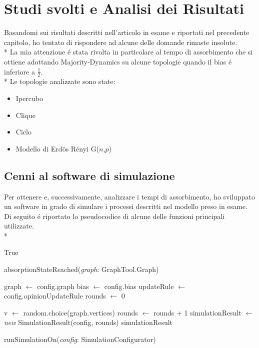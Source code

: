 \documentclass[../Tesi.tex]{subfiles}
\begin{document}
\chapter{Studi svolti e Analisi dei Risultati}
Basandomi sui risultati descritti nell'articolo in esame \cite{DBLP:journals/corr/abs-2008-13589} e riportati nel precedente capitolo, ho tentato di rispondere ad alcune delle domande rimaste insolute.\\*
La mia attenzione \'e stata rivolta in particolare al tempo di assorbimento che si ottiene adottando Majority-Dynamics su alcune topologie quando il bias \'e inferiore a $\frac{1}{2}$.\\*
Le topologie analizzate sono state:
\begin{itemize}
\item Ipercubo
\item Clique
\item Ciclo
\item Modello di Erd{\"o}s R\'enyi G($n$,$p$) \cite{Erdos:1959:pmd}
\end{itemize}

\section{Cenni al software di simulazione}
Per ottenere e, successivamente, analizzare i tempi di assorbimento, ho sviluppato un software in grado di simulare i processi descritti nel modello preso in esame.
Di seguito \'e riportato lo pseudocodice di alcune delle funzioni principali utilizzate.\\*

\begin{algorithm}[H]
  \Return True\;
\caption{absorptionStateReached(\emph{graph}: GraphTool.Graph)}
\end{algorithm}
 
 \hfill \break
 
\begin{algorithm}[H]
  graph $\gets$ config.graph\;
  bias $\gets$ config.bias\;
  updateRule $\gets$ config.opinionUpdateRule\;
  rounds $\gets$ 0\;

  {
    v $\gets$ random.choice(graph.vertices)\;
    rounds $\gets$ rounds + 1\;
  }
  simulationResult $\gets$ \emph{new} SimulationResult(config, rounds)\;
  \Return simulationResult\;
\caption{runSimulationOn(\emph{config}: SimulationConfigurator)}
\end{algorithm}
 
\end{document}
